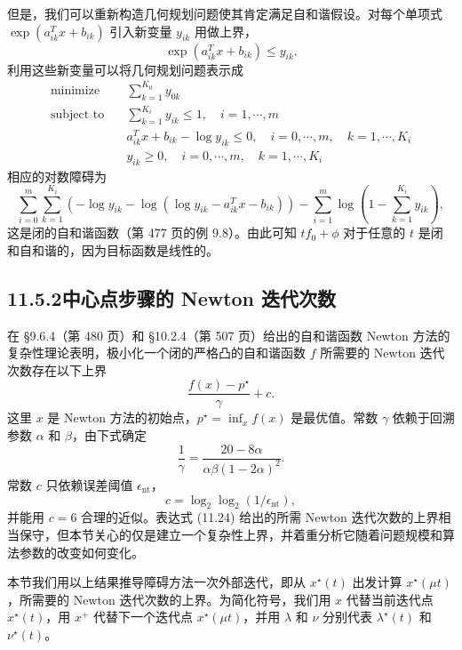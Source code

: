 \documentclass[UTF8,12pt,a4paper,fontset=fandol]{ctexart}
\begin{document}
但是，我们可以重新构造几何规划问题使其肯定满足自和谐假设。对每个单项式 $\exp(a_{ik}^Tx+b_{ik})$ 引入新变量 $y_{ik}$ 用做上界，
\[
\exp(a_{ik}^Tx+b_{ik})\leq y_{ik}.
\]
利用这些新变量可以将几何规划问题表示成
\[
\begin{aligned}
\text{minimize}\quad & \sum_{k=1}^{K_0}y_{0k}\\
\text{subject to}\quad & \sum_{k=1}^{K_i}y_{ik}\leq 1,\quad i=1,\cdots,m\\
& a_{ik}^Tx+b_{ik}-\log y_{ik}\leq 0,\quad i=0,\cdots,m,\quad k=1,\cdots,K_i\\
& y_{ik}\geq 0,\quad i=0,\cdots,m,\quad k=1,\cdots,K_i
\end{aligned}
\]
相应的对数障碍为
\[
\sum_{i=0}^m\sum_{k=1}^{K_i}\left(-\log y_{ik}-\log(\log y_{ik}-a_{ik}^Tx-b_{ik})\right)
-\sum_{i=1}^m\log\left(1-\sum_{k=1}^{K_i}y_{ik}\right),
\]
这是闭的自和谐函数（第 477 页的例 9.8）。由此可知 $tf_0+\phi$ 对于任意的 $t$ 是闭和自和谐的，因为目标函数是线性的。

\subsection*{11.5.2\quad 中心点步骤的 Newton 迭代次数}

在 \S9.6.4（第 480 页）和 \S10.2.4（第 507 页）给出的自和谐函数 Newton 方法的复杂性理论表明，极小化一个闭的严格凸的自和谐函数 $f$ 所需要的 Newton 迭代次数存在以下上界
\begin{equation}
\frac{f(x)-p^\star}{\gamma}+c.
\tag{11.24}
\end{equation}
这里 $x$ 是 Newton 方法的初始点，$p^\star=\inf_x f(x)$ 是最优值。常数 $\gamma$ 依赖于回溯参数 $\alpha$ 和 $\beta$，由下式确定
\[
\frac{1}{\gamma}=\frac{20-8\alpha}{\alpha\beta(1-2\alpha)^2}.
\]
常数 $c$ 只依赖误差阈值 $\epsilon_{\mathrm{nt}}$，
\[
c=\log_2\log_2(1/\epsilon_{\mathrm{nt}}),
\]
并能用 $c=6$ 合理的近似。表达式 (11.24) 给出的所需 Newton 迭代次数的上界相当保守，但本节关心的仅是建立一个复杂性上界，并着重分析它随着问题规模和算法参数的改变如何变化。

本节我们用以上结果推导障碍方法一次外部迭代，即从 $x^\star(t)$ 出发计算 $x^\star(\mu t)$，所需要的 Newton 迭代次数的上界。为简化符号，我们用 $x$ 代替当前迭代点 $x^\star(t)$，用 $x^+$ 代替下一个迭代点 $x^\star(\mu t)$，并用 $\lambda$ 和 $\nu$ 分别代表 $\lambda^\star(t)$ 和 $\nu^\star(t)$。
\end{document}
